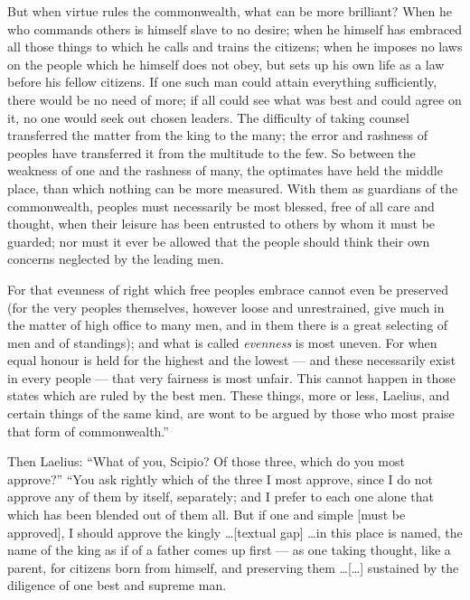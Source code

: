  But when virtue rules the commonwealth, what can be more brilliant? When he who commands others is himself slave to no desire; when he himself has embraced all those things to which he calls and trains the citizens; when he imposes no laws on the people which he himself does not obey, but sets up his own life as a law before his fellow citizens. If one such man could attain everything sufficiently, there would be no need of more; if all could see what was best and could agree on it, no one would seek out chosen leaders. The difficulty of taking counsel transferred the matter from the king to the many; the error and rashness of peoples have transferred it from the multitude to the few. So between the weakness of one and the rashness of many, the optimates have held the middle place, than which nothing can be more measured. With them as guardians of the commonwealth, peoples must necessarily be most blessed, free of all care and thought, when their leisure has been entrusted to others by whom it must be guarded; nor must it ever be allowed that the people should think their own concerns neglected by the leading men.

 For that evenness of right which free peoples embrace cannot even be preserved (for the very peoples themselves, however loose and unrestrained, give much in the matter of high office to many men, and in them there is a great selecting of men and of standings); and what is called \textit{evenness} is most uneven. For when equal honour is held for the highest and the lowest --- and these necessarily exist in every people --- that very fairness is most unfair. This cannot happen in those states which are ruled by the best men. These things, more or less, Laelius, and certain things of the same kind, are wont to be argued by those who most praise that form of commonwealth.''

 Then Laelius: ``What of you, Scipio? Of those three, which do you most approve?'' ``You ask rightly which of the three I most approve, since I do not approve any of them by itself, separately; and I prefer to each one alone that which has been blended out of them all. But if one and simple [must be approved], I should approve the kingly \ldots [textual gap] \ldots in this place is named, the name of the king as if of a father comes up first --- as one taking thought, like a parent, for citizens born from himself, and preserving them \ldots [\ldots] sustained by the diligence of one best and supreme man.

